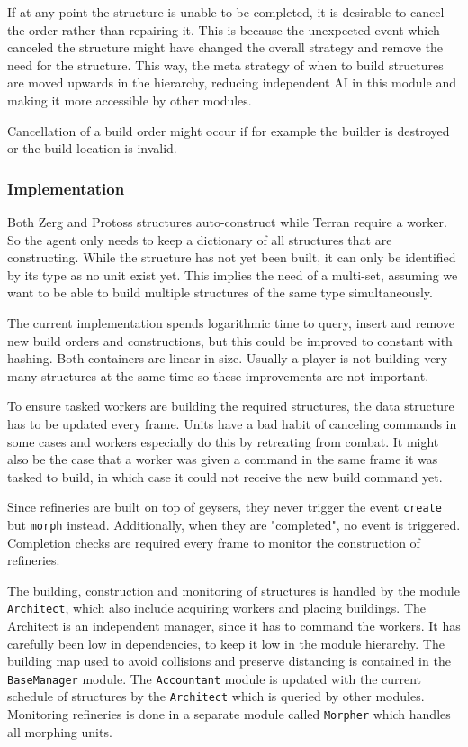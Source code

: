 	If at any point the structure is unable to be completed, it is desirable to cancel the order rather than repairing it. This is because the unexpected event which canceled the structure might have changed the overall strategy and remove the need for the structure. This way, the meta strategy of when to build structures are moved upwards in the hierarchy, reducing independent AI in this module and making it more accessible by other modules.
	
	Cancellation of a build order might occur if for example the builder is destroyed or the build location is invalid.
	
		\subsubsection*{Implementation}
		Both Zerg and Protoss structures auto-construct while Terran require a worker. So the agent only needs to keep a dictionary of all structures that are constructing. While the structure has not yet been built, it can only be identified by its type as no unit exist yet. This implies the need of a multi-set, assuming we want to be able to build multiple structures of the same type simultaneously.
		
		The current implementation spends logarithmic time to query, insert and remove new build orders and constructions, but this could be improved to constant with hashing. Both containers are linear in size. Usually a player is not building very many structures at the same time so these improvements are not important. 
		
		To ensure tasked workers are building the required structures, the data structure has to be updated every frame. Units have a bad habit of canceling commands in some cases and workers especially do this by retreating from combat. It might also be the case that a worker was given a command in the same frame it was tasked to build, in which case it could not receive the new build command yet.
		
		Since refineries are built on top of geysers, they never trigger the event \texttt{create} but \texttt{morph} instead. Additionally, when they are "completed", no event is triggered. Completion checks are required every frame to monitor the construction of refineries.
		
		The building, construction and monitoring of structures is handled by the module \texttt{Architect}, which also include acquiring workers and placing buildings. The Architect is an independent manager, since it has to command the workers. It has carefully been low in dependencies, to keep it low in the module hierarchy. The building map used to avoid collisions and preserve distancing is contained in the \texttt{BaseManager} module. The \texttt{Accountant} module is updated with the current schedule of structures by the \texttt{Architect} which is queried by other modules. Monitoring refineries is done in a separate module called \texttt{Morpher} which handles all morphing units.

